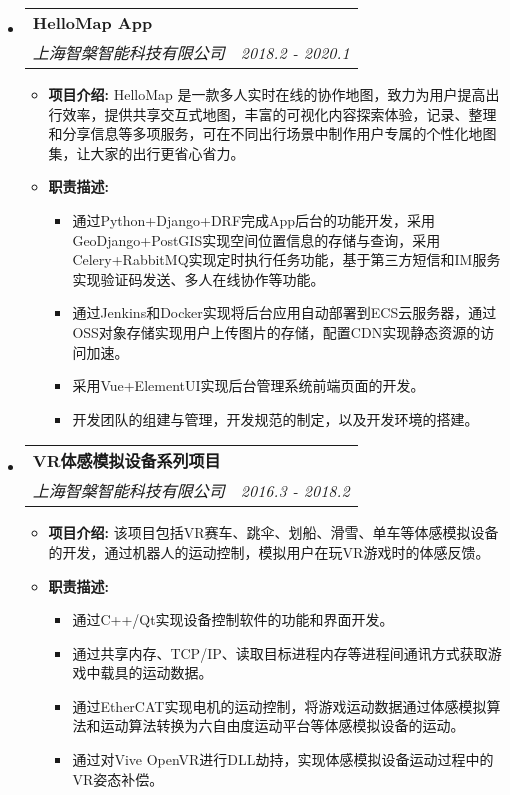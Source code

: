 \documentclass[letterpaper,11pt]{article}
\makeatletter
\newcommand{\resitem}[1]{\item #1 \vspace{-2pt}}
\newcommand{\ressubheading}[4]{
\begin{tabular*}{6.5in}{l@{\cftdotfill{\cftsecdotsep}\extracolsep{\fill}}r}
\textbf{#1} & #2 \\
\textit{#3} & \textit{#4} \\
\end{tabular*}\vspace{-6pt}}
\makeatother
\begin{document}
\begin{itemize}
  \item
  \ressubheading{HelloMap App}{}{上海智槃智能科技有限公司}{2018.2 - 2020.1}
  \begin{itemize}
    \resitem{ {\bf 项目介绍:} HelloMap 是一款多人实时在线的协作地图，致力为用户提高出行效率，提供共享交互式地图，丰富的可视化内容探索体验，记录、整理和分享信息等多项服务，可在不同出行场景中制作用户专属的个性化地图集，让大家的出行更省心省力。} %
    \resitem{ {\bf 职责描述:}
      \begin{itemize}
        \item 通过Python+Django+DRF完成App后台的功能开发，采用GeoDjango+PostGIS实现空间位置信息的存储与查询，采用Celery+RabbitMQ实现定时执行任务功能，基于第三方短信和IM服务实现验证码发送、多人在线协作等功能。
        \item 通过Jenkins和Docker实现将后台应用自动部署到ECS云服务器，通过OSS对象存储实现用户上传图片的存储，配置CDN实现静态资源的访问加速。
        \item 采用Vue+ElementUI实现后台管理系统前端页面的开发。
        \item 开发团队的组建与管理，开发规范的制定，以及开发环境的搭建。
      \end{itemize}
    }
  \end{itemize}

  \item
  \ressubheading{VR体感模拟设备系列项目}{}{上海智槃智能科技有限公司}{2016.3 - 2018.2}
  \begin{itemize}
    \resitem{ {\bf 项目介绍:} 该项目包括VR赛车、跳伞、划船、滑雪、单车等体感模拟设备的开发，通过机器人的运动控制，模拟用户在玩VR游戏时的体感反馈。}
    \resitem{ {\bf 职责描述:}
      \begin{itemize}
        \item 通过C++/Qt实现设备控制软件的功能和界面开发。
        \item 通过共享内存、TCP/IP、读取目标进程内存等进程间通讯方式获取游戏中载具的运动数据。
        \item 通过EtherCAT实现电机的运动控制，将游戏运动数据通过体感模拟算法和运动算法转换为六自由度运动平台等体感模拟设备的运动。
        \item 通过对Vive OpenVR进行DLL劫持，实现体感模拟设备运动过程中的VR姿态补偿。
      \end{itemize}}
  \end{itemize}


\end{itemize}
\end{document}
